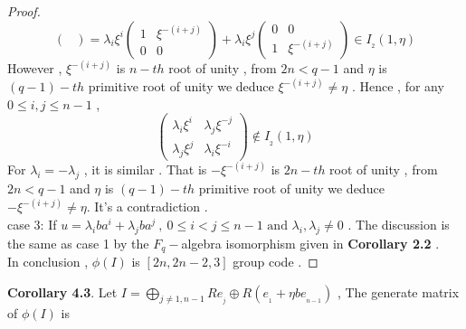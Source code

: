 \documentclass{article}
\begin{document}
\begin{proof}
\begin{equation*}
\begin{pmatrix}
    \end{pmatrix}
    =\lambda_i\xi^{\scriptscriptstyle i}
    \begin{pmatrix}
        1&\xi^{\scriptscriptstyle-(i+j)}\\
        0&0
    \end{pmatrix}
    +\lambda_i\xi^{\scriptscriptstyle j}
    \begin{pmatrix}
        0&0\\
        1&\xi^{-\scriptscriptstyle(i+j)}
    \end{pmatrix}\in{I_{_2}}(1,\eta)
\end{equation*}
However , $\xi^{-\scriptscriptstyle(i+j)}$ is $n-th$ root of unity , from $2n<q-1$ and $\eta$ is $ (q-1)-th$ primitive root of unity we deduce $\xi^{-\scriptscriptstyle(i+j)}\neq\eta$ . Hence , for any $0\leq i,j\leq n-1$ , 
\begin{equation*}
    \begin{pmatrix}
        \lambda_i\xi^{\scriptscriptstyle i}&\lambda_j\xi^{\scriptscriptstyle-j}\\
        \lambda_j\xi^{\scriptscriptstyle j}&\lambda_i\xi^{\scriptscriptstyle-i}
    \end{pmatrix}\notin{I_{_2}}(1,\eta)
\end{equation*}
For $\lambda_i=-\lambda_j$ , it is similar . That is $-\xi^{-\scriptscriptstyle(i+j)}$ is $2n-th$ root of unity , from $2n<q-1$ and $\eta$ is $ (q-1)-th$ primitive root of unity we deduce $-\xi^{-\scriptscriptstyle(i+j)}\neq\eta$. It's a contradiction .\\
case 3: If $u=\lambda_{i}ba^{\scriptscriptstyle i}+\lambda_{j}ba^{\scriptscriptstyle j}\:,\:0\leq i<j\leq n-1 \text{ and } \lambda_i,\lambda_j\neq0$ . The discussion is the same as case 1 by the $F_q-$algebra isomorphism given in \textbf{Corollary 2.2} .\\
In conclusion , $\phi(I)$ is $[2n,2n-2,3]$ group code .
\end{proof}
\textbf{Corollary 4.3}. Let $I=\mathop{\bigoplus}\limits_{j\neq 1,n-1}Re_{_j}\oplus R(e_{_1}+\eta be_{_{n-1}})$ , The generate matrix of $\phi(I)$ is 
\end{document}
